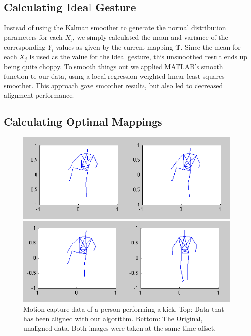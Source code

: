 \documentclass{article}
\begin{document}
\subsection{Calculating Ideal Gesture}

Instead of using the Kalman smoother to generate the normal distribution parameters
for each $X_j$, we simply calculated the mean and variance of the corresponding
$Y_i$ values as given by the current mapping $\mathbf{T}$. Since the mean for each
$X_j$ is used as the value for the ideal gesture, this unsmoothed result ends up being
quite choppy. To smooth things out we applied MATLAB's smooth function to our data,
using a local regression weighted linear least squares smoother. This approach gave
smoother results, but also led to decreased alignment performance.

\subsection{Calculating Optimal Mappings}


\begin{figure}
\begin{centering}

\begin{centering}
\includegraphics[width=\columnwidth]{figures/kick_aligned.png}	
\end{centering}
\begin{centering}
\includegraphics[width=\columnwidth]{figures/kick_unaligned.png}	
\end{centering}

\vspace{-0.2in}

\caption{Motion capture data of a person performing a kick. Top: Data that has
been aligned with our algorithm. Bottom: The Original, unaligned data. Both
images were taken at the same time offset. \label{figure:kick}}

\end{centering}
\end{figure}
\end{document}
